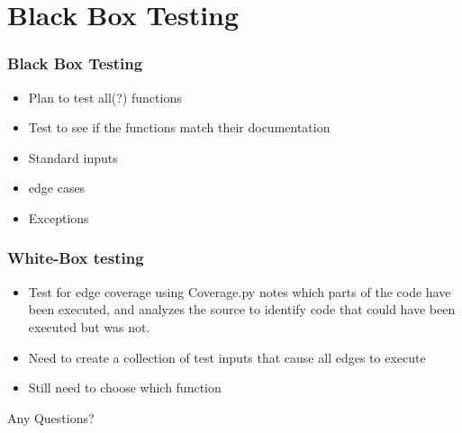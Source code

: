 \documentclass{beamer}
\begin{document}
\section{Black Box Testing}
\begin{frame}\frametitle{Black Box Testing} 

\begin{itemize}
\item Plan to test all(?) functions
\item Test to see if the functions match their documentation

\item Standard inputs
\item edge cases
\item Exceptions 

\end{itemize}
\end{frame}


\begin{frame}\frametitle{White-Box testing} 
\begin{itemize}
\item Test for edge coverage using Coverage.py
 notes which parts of the code have been executed, and analyzes the source to identify code that could have been executed but was not.
\item Need to create a collection of test inputs that cause all edges to execute
\item Still need to choose which function
\end{itemize}
\end{frame}

\begin{frame}
Any Questions?
\end{frame}
\end{document}
